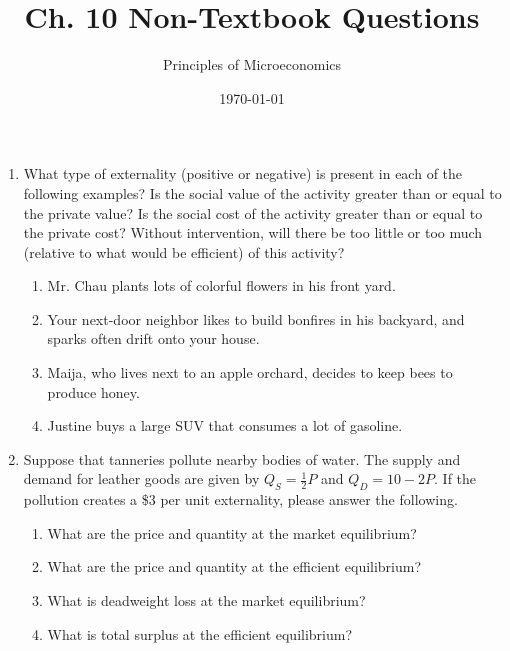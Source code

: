 \documentclass{article}
\title{Ch. 10 Non-Textbook Questions}
\author{Principles of Microeconomics}
\date{\today}
\begin{document}
\maketitle

\begin{enumerate}

\item What type of externality (positive or negative) is present in each of the following examples? Is the social value of the activity greater than or equal to the private value? Is the social cost of the activity greater than or equal to the private cost? Without intervention, will there be too little or too much (relative to what would be efficient) of this activity?

	\begin{enumerate}
	
	\item Mr. Chau plants lots of colorful flowers in his front yard.
	
	\item Your next-door neighbor likes to build bonfires in his backyard, and sparks often drift onto your house.
	
	\item Maija, who lives next to an apple orchard, decides to keep bees to produce honey.
	
	\item Justine buys a large SUV that consumes a lot of gasoline.
	
	\end{enumerate}
	
\item Suppose that tanneries pollute nearby bodies of water. The supply and demand for leather goods are given by $Q_S = \frac{1}{2}P$ and $Q_D = 10 - 2P$. If the pollution creates a \$3 per unit externality, please answer the following.

	\begin{enumerate}
	
	\item What are the price and quantity at the market equilibrium?
	
	\item What are the price and quantity at the efficient equilibrium?
	
	\item What is deadweight loss at the market equilibrium? 
	
	\item What is total surplus at the efficient equilibrium?
	

\end{enumerate}
\end{enumerate}
\end{document}
